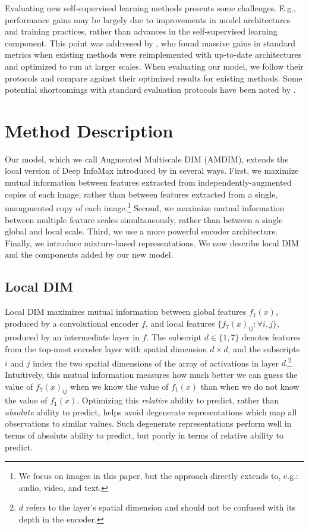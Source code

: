 \documentclass{article}
\begin{document}
Evaluating new self-supervised learning methods presents some challenges. E.g., performance gains may be largely due to improvements in model architectures and training practices, rather than advances in the self-supervised learning component. This point was addressed by \cite{Kolesnikov2019}, who found massive gains in standard metrics when existing methods were reimplemented with up-to-date architectures and optimized to run at larger scales. When evaluating our model, we follow their protocols and compare against their optimized results for existing methods.
Some potential shortcomings with standard evaluation protocols have been noted by \cite{Goyal2019}.


% 
\section{Method Description}
\label{sec:method}
Our model, which we call Augmented Multiscale DIM (AMDIM), extends the local version of Deep InfoMax introduced by \citet{Hjelm2019} in several ways.
First, we maximize mutual information between features extracted from independently-augmented copies of each image, rather than between features extracted from a single, unaugmented copy of each image.\footnote{We focus on images in this paper, but the approach directly extends to, e.g.: audio, video, and text.}
Second, we maximize mutual information between multiple feature scales simultaneously, rather than between a single global and local scale.
Third, we use a more powerful encoder architecture. Finally, we introduce mixture-based representations. We now describe local DIM and the components added by our new model.

\subsection{Local DIM}
Local DIM maximizes mutual information between global features $f_1(x)$, produced by a convolutional encoder $f$, and local features  $\{f_7(x)_{ij}: \forall{i, j} \}$, produced by an intermediate layer in $f$.
The subscript $d \in \{1, 7\}$ denotes features from the top-most encoder layer with spatial dimension $d \times d$, and the subscripts $i$ and $j$ index the two spatial dimensions of the  array of activations in layer $d$.\footnote{$d$ refers to the layer's spatial dimension and should not be confused with its depth in the encoder.}
Intuitively, this mutual information measures how much better we can guess the value of $f_7(x)_{ij}$ when we know the value of $f_1(x)$ than when we do not know the value of $f_1(x)$. 
Optimizing this \emph{relative} ability to predict, rather than \emph{absolute} ability to predict, helps avoid degenerate representations which map all observations to similar values. 
Such degenerate representations perform well in terms of absolute ability to predict, but poorly in terms of relative ability to predict.
\end{document}
